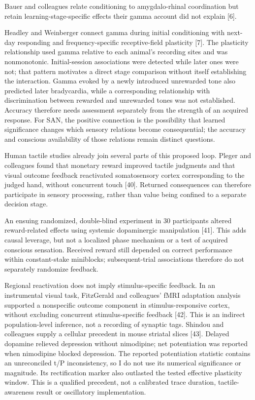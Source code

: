 \documentclass[
  american,
  11pt,
  letterpaper,
]{article}
\begin{document}
Bauer and colleagues relate conditioning to amygdalo-rhinal coordination but retain learning-stage-specific effects their gamma account did not explain {[}6{]}.

Headley and Weinberger connect gamma during initial conditioning with next-day responding and frequency-specific receptive-field plasticity {[}7{]}. The plasticity relationship used gamma relative to each animal's recording sites and was nonmonotonic. Initial-session associations were detected while later ones were not; that pattern motivates a direct stage comparison without itself establishing the interaction. Gamma evoked by a newly introduced unrewarded tone also predicted later bradycardia, while a corresponding relationship with discrimination between rewarded and unrewarded tones was not established. Accuracy therefore needs assessment separately from the strength of an acquired response. For SAN, the positive connection is the possibility that learned significance changes which sensory relations become consequential; the accuracy and conscious availability of those relations remain distinct questions.

Human tactile studies already join several parts of this proposed loop. Pleger and colleagues found that monetary reward improved tactile judgments and that visual outcome feedback reactivated somatosensory cortex corresponding to the judged hand, without concurrent touch {[}40{]}. Returned consequences can therefore participate in sensory processing, rather than value being confined to a separate decision stage.

An ensuing randomized, double-blind experiment in 30 participants altered reward-related effects using systemic dopaminergic manipulation {[}41{]}. This adds causal leverage, but not a localized phase mechanism or a test of acquired conscious sensation. Received reward still depended on correct performance within constant-stake miniblocks; subsequent-trial associations therefore do not separately randomize feedback.

Regional reactivation does not imply stimulus-specific feedback. In an instrumental visual task, FitzGerald and colleagues' fMRI adaptation analysis supported a nonspecific outcome component in stimulus-responsive cortex, without excluding concurrent stimulus-specific feedback {[}42{]}. This is an indirect population-level inference, not a recording of synaptic tags. Shindou and colleagues supply a cellular precedent in mouse striatal slices {[}43{]}. Delayed dopamine relieved depression without nimodipine; net potentiation was reported when nimodipine blocked depression. The reported potentiation statistic contains an unreconciled t/P inconsistency, so I do not use its numerical significance or magnitude. Its rectification marker also outlasted the tested effective plasticity window. This is a qualified precedent, not a calibrated trace duration, tactile-awareness result or oscillatory implementation.
\end{document}
